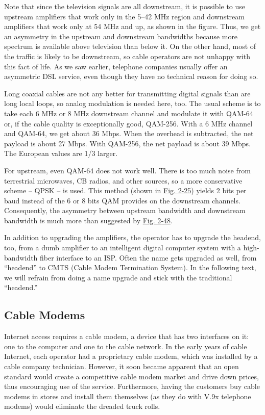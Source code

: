 Note that since the television signals are all downstream, it is
possible to use upstream amplifiers that work only in the 5--42 MHz
region and downstream amplifiers that work only at 54 MHz and up, as
shown in the figure. Thus, we get an asymmetry in the upstream and
downstream bandwidths because more spectrum is available above
television than below it. On the other hand, most of the traffic is
likely to be downstream, so cable operators are not unhappy with this
fact of life. As we saw earlier, telephone companies usually offer an
asymmetric DSL service, even though they have no technical reason for
doing so.

Long coaxial cables are not any better for transmitting digital signals
than are long local loops, so analog modulation is needed here, too. The
usual scheme is to take each 6 MHz or 8 MHz downstream channel and
modulate it with QAM-64 or, if the cable quality is exceptionally good,
QAM-256. With a 6 MHz channel and QAM-64, we get about 36 Mbps. When the
overhead is subtracted, the net payload is about 27 Mbps. With QAM-256,
the net payload is about 39 Mbps. The European values are 1/3 larger.

For upstream, even QAM-64 does not work well. There is too much noise
from terrestrial microwaves, CB radios, and other sources, so a more
conservative scheme -- QPSK -- is used. This method (shown in
\protect\hyperlink{0130661023_ch02lev1sec6.htmlux5cux23ch02fig45}{Fig.
2-25}) yields 2 bits per baud instead of the 6 or 8 bits QAM provides on
the downstream channels. Consequently, the asymmetry between upstream
bandwidth and downstream bandwidth is much more than suggested by
\protect\hyperlink{0130661023_ch02lev1sec7.htmlux5cux23ch02fig48}{Fig.
2-48}.

In addition to upgrading the amplifiers, the operator has to upgrade the
headend, too, from a dumb amplifier to an intelligent digital computer
system with a high-bandwidth fiber interface to an ISP. Often the name
gets upgraded as well, from ``headend'' to {CMTS} ({Cable Modem
Termination System}). In the following text, we will refrain from doing
a name upgrade and stick with the traditional ``headend.''

\protect\hypertarget{0130661023_ch02lev1sec7.htmlux5cux23ch02lev2sec28}{}{}

\subsection{Cable Modems}

Internet access requires a cable modem, a device that has two interfaces
on it: one to the computer and one to the cable network. In the early
years of cable Internet, each operator had a proprietary cable modem,
which was installed by a cable company technician. However, it soon
became apparent that an open standard would create a competitive cable
modem market and drive down prices, thus encouraging use of the service.
Furthermore, having the customers buy cable modems in stores and install
them themselves (as they do with V.9x telephone modems) would eliminate
the dreaded truck rolls.

